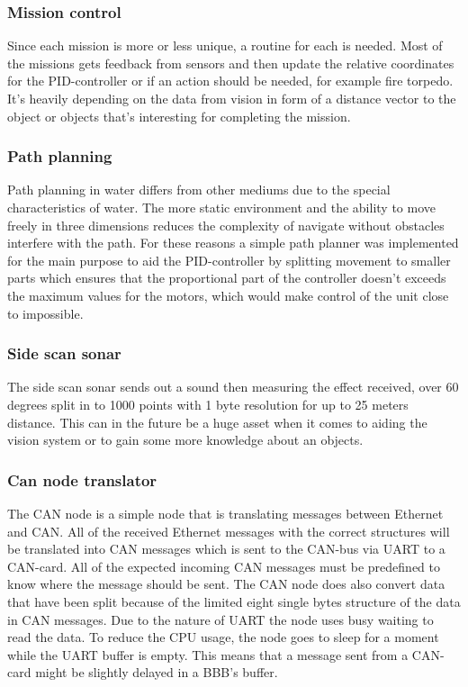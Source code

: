  
 
		\subsubsection{Mission control} %
		\noindent Since each mission is more or less unique, a routine for each is needed.
		Most of the missions gets feedback from sensors and then update the relative coordinates for the PID-controller or if an action should be needed, for example fire torpedo.
		It's heavily depending on the data from vision in form of a distance vector to the object or objects that's interesting for completing the mission.
		
		\subsubsection{Path planning} %
		\noindent Path planning in water differs from other mediums due to the special characteristics of water. The more static environment and the ability to move freely in three dimensions reduces the complexity of navigate without obstacles interfere with the path. For these reasons a simple path planner was implemented for the main purpose to aid the PID-controller by splitting movement to smaller parts which ensures that the proportional part of the controller doesn't exceeds the maximum values for the motors, which would make control of the unit close to impossible. 
		
				\subsubsection{Side scan sonar} %
		\noindent The side scan sonar \cite{side_scan_sonar} sends out a sound then measuring the effect received, over 60 degrees split in to 1000 points with 1 byte resolution for up to 25 meters distance. This can in the future be a huge asset when it comes to aiding the vision system or to gain some more knowledge about an objects.


\subsubsection{Can node translator} %
\noindent The CAN node is a simple node that is translating messages between Ethernet and CAN. All of the received Ethernet messages with the correct structures will be translated into CAN messages which is sent to the CAN-bus via UART to a CAN-card. All of the expected incoming CAN messages must be predefined to know where the message should be sent. The CAN node does also convert data that have been split because of the limited eight single bytes structure of the data in CAN messages. Due to the nature of UART the node uses busy waiting to read the data. To reduce the CPU usage, the node goes to sleep for a moment while the UART buffer is empty. This means that a message sent from a CAN-card might be slightly delayed in a BBB's buffer.


